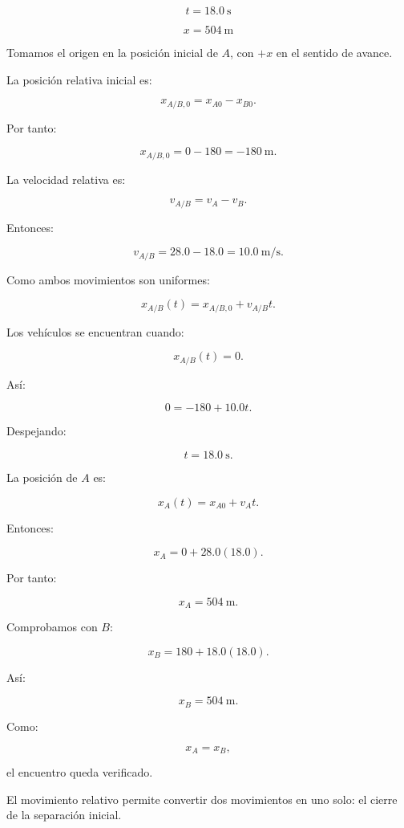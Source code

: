\begin{respuesta}
\[
\boxed{
t=\SI{18.0}{\second}
}
\]

\[
\boxed{
x=\SI{504}{\meter}
}
\]
\end{respuesta}

\begin{explicacion}
Tomamos el origen en la posición inicial
de \(A\), con \(+x\) en el sentido de avance.

La posición relativa inicial es:

\[
x_{A/B,0}
=
x_{A0}-x_{B0}.
\]

Por tanto:

\[
x_{A/B,0}=0-180=-\SI{180}{\meter}.
\]

La velocidad relativa es:

\[
v_{A/B}=v_A-v_B.
\]

Entonces:

\[
v_{A/B}=28.0-18.0
=\SI{10.0}{\meter\per\second}.
\]

Como ambos movimientos son uniformes:

\[
x_{A/B}(t)
=
x_{A/B,0}+v_{A/B}t.
\]

Los vehículos se encuentran cuando:

\[
x_{A/B}(t)=0.
\]

Así:

\[
0=-180+10.0t.
\]

Despejando:

\[
\boxed{
t=\SI{18.0}{\second}
}.
\]

La posición de \(A\) es:

\[
x_A(t)=x_{A0}+v_At.
\]

Entonces:

\[
x_A=0+28.0(18.0).
\]

Por tanto:

\[
\boxed{
x_A=\SI{504}{\meter}
}.
\]

Comprobamos con \(B\):

\[
x_B=180+18.0(18.0).
\]

Así:

\[
x_B=\SI{504}{\meter}.
\]

Como:

\[
x_A=x_B,
\]

el encuentro queda verificado.

El movimiento relativo permite convertir
dos movimientos en uno solo: el cierre
de la separación inicial.
\end{explicacion}


